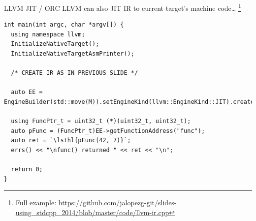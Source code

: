 \begin{frame}[fragile]{LLVM JIT / ORC}
  LLVM can also JIT IR to current target's machine code\ldots{}%
  \footnote{Full example: \url{https://github.com/jalopezg-git/slides-using_stdcpp_2014/blob/master/code/llvm-ir.cpp}}

  \vfill
  \begin{lstlisting}[style=c++]
int main(int argc, char *argv[]) {
  using namespace llvm;
  InitializeNativeTarget();
  InitializeNativeTargetAsmPrinter();

  /* CREATE IR AS IN PREVIOUS SLIDE */
  
  auto EE = EngineBuilder(std::move(M)).setEngineKind(llvm::EngineKind::JIT).create();

  using FuncPtr_t = uint32_t (*)(uint32_t, uint32_t);
  auto pFunc = (FuncPtr_t)EE->getFunctionAddress("func");
  auto ret = `\lsthl{pFunc(42, 7)}`;
  errs() << "\nfunc() returned " << ret << "\n";

  return 0;
}
  \end{lstlisting}

\end{frame}

